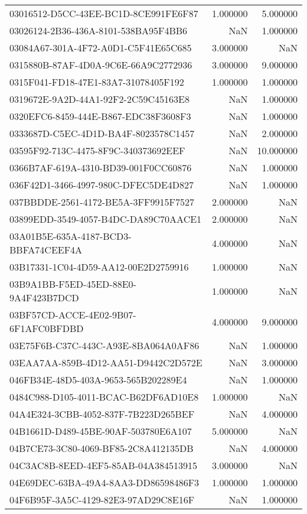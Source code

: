 \begin{tabular}{lrr}
03016512-D5CC-43EE-BC1D-8CE991FE6F87 & 1.000000 & 5.000000 \\
03026124-2B36-436A-8101-538BA95F4BB6 & NaN & 1.000000 \\
03084A67-301A-4F72-A0D1-C5F41E65C685 & 3.000000 & NaN \\
0315880B-87AF-4D0A-9C6E-66A9C2772936 & 3.000000 & 9.000000 \\
0315F041-FD18-47E1-83A7-31078405F192 & 1.000000 & 1.000000 \\
0319672E-9A2D-44A1-92F2-2C59C45163E8 & NaN & 1.000000 \\
0320EFC6-8459-444E-B867-EDC38F3608F3 & NaN & 1.000000 \\
0333687D-C5EC-4D1D-BA4F-8023578C1457 & NaN & 2.000000 \\
03595F92-713C-4475-8F9C-340373692EEF & NaN & 10.000000 \\
0366B7AF-619A-4310-BD39-001F0CC60876 & NaN & 1.000000 \\
036F42D1-3466-4997-980C-DFEC5DE4D827 & NaN & 1.000000 \\
037BBDDE-2561-4172-BE5A-3FF9915F7527 & 2.000000 & NaN \\
03899EDD-3549-4057-B4DC-DA89C70AACE1 & 2.000000 & NaN \\
03A01B5E-635A-4187-BCD3-BBFA74CEEF4A & 4.000000 & NaN \\
03B17331-1C04-4D59-AA12-00E2D2759916 & 1.000000 & NaN \\
03B9A1BB-F5ED-45ED-88E0-9A4F423B7DCD & 1.000000 & NaN \\
03BF57CD-ACCE-4E02-9B07-6F1AFC0BFDBD & 4.000000 & 9.000000 \\
03E75F6B-C37C-443C-A93E-8BA064A0AF86 & NaN & 1.000000 \\
03EAA7AA-859B-4D12-AA51-D9442C2D572E & NaN & 3.000000 \\
046FB34E-48D5-403A-9653-565B202289E4 & NaN & 1.000000 \\
0484C988-D105-4011-BCAC-B62DF6AD10E8 & 1.000000 & NaN \\
04A4E324-3CBB-4052-837F-7B223D265BEF & NaN & 4.000000 \\
04B1661D-D489-45BE-90AF-503780E6A107 & 5.000000 & NaN \\
04B7CE73-3C80-4069-BF85-2C8A412135DB & NaN & 4.000000 \\
04C3AC8B-8EED-4EF5-85AB-04A384513915 & 3.000000 & NaN \\
04E69DEC-63BA-49A4-8AA3-DD86598486F3 & 1.000000 & 1.000000 \\
04F6B95F-3A5C-4129-82E3-97AD29C8E16F & NaN & 1.000000 \\

\end{tabular}
